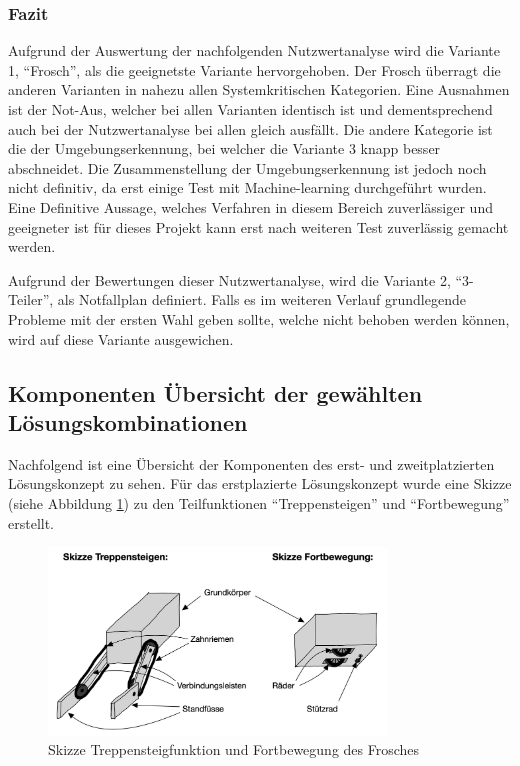 \subsubsection*{Fazit}
Aufgrund der Auswertung der nachfolgenden Nutzwertanalyse wird die Variante 1, ``Frosch'', als die geeignetste Variante hervorgehoben. Der Frosch überragt die anderen Varianten in nahezu allen Systemkritischen Kategorien. Eine Ausnahmen ist der Not-Aus, welcher bei allen Varianten identisch ist und dementsprechend auch bei der Nutzwertanalyse bei allen gleich ausfällt. Die andere Kategorie ist die der Umgebungserkennung, bei welcher die Variante 3 knapp besser abschneidet. Die Zusammenstellung der Umgebungserkennung ist jedoch noch nicht definitiv, da erst einige Test mit Machine-learning durchgeführt wurden. Eine Definitive Aussage, welches Verfahren in diesem Bereich zuverlässiger und geeigneter ist für dieses Projekt kann erst nach weiteren Test zuverlässig gemacht werden.

Aufgrund der Bewertungen dieser Nutzwertanalyse, wird die Variante 2, ``3-Teiler'', als Notfallplan definiert. Falls es im weiteren Verlauf grundlegende Probleme mit der ersten Wahl geben sollte, welche nicht behoben werden können, wird auf diese Variante ausgewichen.

\subsection*{Komponenten Übersicht der gewählten Lösungskombinationen}
Nachfolgend ist eine Übersicht der Komponenten des erst- und zweitplatzierten Lösungskonzept zu sehen. Für das erstplazierte Lösungskonzept wurde eine Skizze (siehe Abbildung \ref{fig:Frosch-Treppensteigfunktion}) zu den Teilfunktionen ``Treppensteigen'' und ``Fortbewegung'' erstellt.

\vspace{2cm}

\begin{figure}[H]
  \includegraphics[width=0.8\textwidth]{img/Skizze Frosch.png}
  \centering
  \caption{Skizze Treppensteigfunktion und Fortbewegung des Frosches}
  \label{fig:Frosch-Treppensteigfunktion}
\end{figure}


